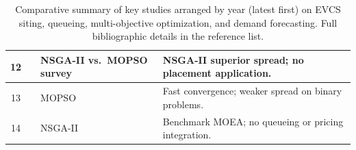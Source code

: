 \begin{table}[htbp]
\begin{tabular}{|c|p{9em}|p{10em}|p{17em}|}
\hline
12 & \cite{reyes_sierra_2006}
   & NSGA-II vs.\ MOPSO survey
   & NSGA-II superior spread; no placement application. \\
\hline
13 & \cite{coello_mopso_2002}
   & MOPSO
   & Fast convergence; weaker spread on binary problems. \\
\hline
14 & \cite{deb_nsga2_2002}
   & NSGA-II
   & Benchmark MOEA; no queueing or pricing integration. \\
\hline
\end{tabular}
\caption{Comparative summary of key studies arranged by year (latest first) on
EVCS siting, queueing, multi-objective optimization, and demand forecasting.
Full bibliographic details in the reference list.}
\label{tab:lit_survey}
\end{table}